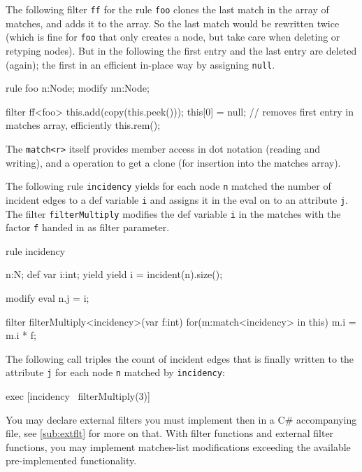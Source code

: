 \begin{example}
The following filter \texttt{ff} for the rule \texttt{foo} clones the last match in the array of matches, and adds it to the array.
So the last match would be rewritten twice (which is fine for \texttt{foo} that only creates a node, but take care when deleting or retyping nodes).
But in the following the first entry and the last entry are deleted (again); the first in an efficient in-place way by assigning \texttt{null}.
\begin{grgen}
rule foo
{
	n:Node;
	modify{
		nn:Node;
	}
}

filter ff<foo>
{
	this.add(copy(this.peek()));
	this[0] = null; // removes first entry in matches array, efficiently
	this.rem();
}
\end{grgen}
\end{example}

The  \texttt{match<r>} itself provides member access in dot notation (reading and writing), and a  operation to get a clone (for insertion into the matches array).

\begin{example}
The following rule \texttt{incidency} yields for each node \texttt{n} matched the number of incident edges to a def variable \texttt{i} and assigns it in the eval on to an attribute \texttt{j}.
The filter \texttt{filterMultiply} modifies the def variable \texttt{i} in the matches with the factor \texttt{f} handed in as filter parameter.
\begin{grgen}
rule incidency
{
	n:N;
	def var i:int;
	yield { yield i = incident(n).size(); }
	
	modify{
		eval { n.j = i; }
	}
}

filter filterMultiply<incidency>(var f:int)
{
	for(m:match<incidency> in this)
	{
		m.i = m.i * f;
	}
}
\end{grgen}
The following call triples the count of incident edges that is finally written to the attribute \texttt{j} for each node \texttt{n} matched by \texttt{incidency}:
\begin{grshell}
  exec [incidency \ filterMultiply(3)]
\end{grshell}
\end{example}

You may declare external filters you must implement then in a C\# accompanying file, see \ref{sub:extflt} for more on that.
With filter functions and external filter functions, you may implement matches-list modifications exceeding the available pre-implemented functionality.


